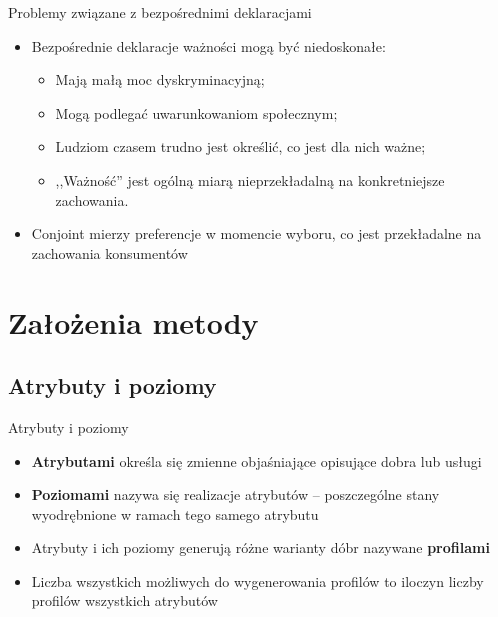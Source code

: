 \documentclass{beamer}
\begin{document}
\begin{frame}{Problemy związane z bezpośrednimi deklaracjami}
  \begin{itemize}
  \item Bezpośrednie deklaracje ważności mogą być niedoskonałe:
    \begin{itemize}
    \item Mają małą moc dyskryminacyjną;
    \item Mogą podlegać uwarunkowaniom społecznym;
    \item Ludziom czasem trudno jest określić, co jest dla nich ważne;
    \item ,,Ważność'' jest ogólną miarą nieprzekładalną na konkretniejsze zachowania.
    \end{itemize}
  \item Conjoint mierzy preferencje w momencie wyboru, co jest przekładalne na zachowania konsumentów
  \end{itemize}
\end{frame}

\section{Założenia metody}

\subsection{Atrybuty i poziomy}
\begin{frame}{Atrybuty i poziomy}
  \begin{itemize}
  \item \textbf{Atrybutami} określa się zmienne objaśniające opisujące dobra lub usługi
  \item \textbf{Poziomami} nazywa się realizacje atrybutów -- poszczególne stany wyodrębnione w ramach tego samego atrybutu
  \item Atrybuty i ich poziomy generują różne warianty dóbr nazywane \textbf{profilami}
  \item Liczba wszystkich możliwych do wygenerowania profilów to iloczyn liczby profilów wszystkich atrybutów
  \end{itemize}
\end{frame}
\end{document}

